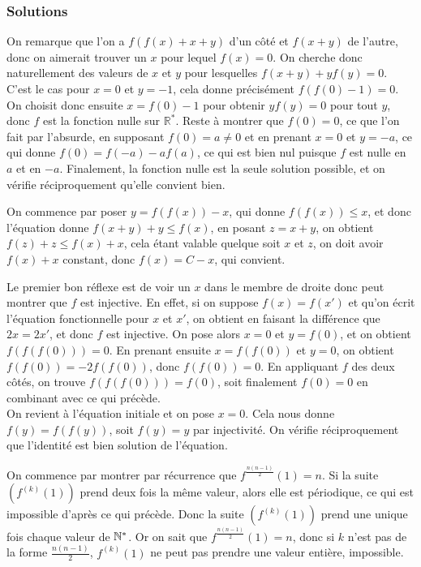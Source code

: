 

\subsubsection{Solutions}

\begin{sol}
On remarque que l'on a $f(f(x)+x+y)$ d'un côté et $f(x+y)$ de l'autre, donc on aimerait trouver un $x$ pour lequel $f(x)=0$. On cherche donc naturellement des valeurs de $x$ et $y$ pour lesquelles $f(x+y)+yf(y)=0$. C'est le cas pour $x=0$ et $y=-1$, cela donne précisément $f(f(0)-1)=0$. On choisit donc ensuite $x=f(0)-1$ pour obtenir $yf(y)=0$ pour tout $y$, donc $f$ est la fonction nulle sur $\mathbb R^*$. Reste à montrer que $f(0)=0$, ce que l'on fait par l'absurde, en supposant $f(0)=a\neq 0$ et en prenant $x=0$ et $y=-a$, ce qui donne $f(0)=f(-a)-af(a)$, ce qui est bien nul puisque $f$ est nulle en $a$ et en $-a$. Finalement, la fonction nulle est la seule solution possible, et on vérifie réciproquement qu'elle convient bien.
\end{sol}


\begin{sol}
On commence par poser $y=f(f(x))-x$, qui donne $f(f(x))\le x$, et donc l'équation donne $f(x+y)+y\le f(x)$, en posant $z=x+y$, on obtient $f(z)+z\le f(x)+x$, cela étant valable quelque soit $x$ et $z$, on doit avoir $f(x)+x$ constant, donc $f(x)=C-x$, qui convient.
\end{sol}

\begin{sol}
Le premier bon réflexe est de voir un $x$ dans le membre de droite donc peut montrer que $f$ est injective. En effet, si on suppose $f(x)=f(x')$ et qu'on écrit l'équation fonctionnelle pour $x$ et $x'$, on obtient en faisant la différence que $2x=2x'$, et donc $f$ est injective. On pose alors $x=0$ et $y=f(0)$, et on obtient $f(f(f(0)))=0$. En prenant ensuite $x=f(f(0))$ et $y=0$, on obtient $f(f(0))=-2f(f(0))$, donc $f(f(0))=0$. En appliquant $f$ des deux côtés, on trouve $f(f(f(0)))=f(0)$, soit finalement $f(0)=0$ en combinant avec ce qui précède. \\
On revient à l'équation initiale et on pose $x=0$. Cela nous donne $f(y)=f(f(y))$, soit $f(y)=y$ par injectivité. On vérifie réciproquement que l'identité est bien solution de l'équation.
\end{sol}


\begin{sol}
On commence par montrer par récurrence que $f^{\frac{n(n-1)}{2}}(1) = n$. Si la suite $(f^{(k)}(1))$ prend deux fois la même valeur, alors elle est périodique, ce qui est impossible d'après ce qui précède. Donc la suite $(f^{(k)}(1))$ prend une unique fois chaque valeur de $\mathbb N^*$. Or on sait que $f^{\frac{n(n-1)}{2}}(1)=n$, donc si $k$ n'est pas de la forme $\displaystyle\frac{n(n-1)}{2}$, $f^{(k)}(1)$ ne peut pas prendre une valeur entière, impossible.
\end{sol}


